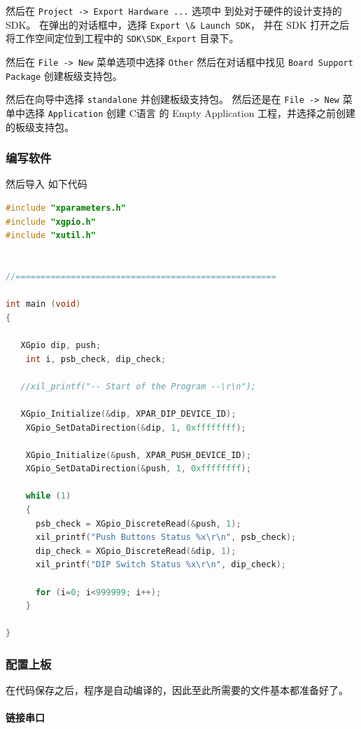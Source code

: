 \documentclass{ctexart}
\begin{document}
        然后在 \verb|Project -> Export Hardware ...| 选项中
        到处对于硬件的设计支持的 SDK。
        在弹出的对话框中，选择 \verb|Export \& Launch SDK|，
        并在 SDK 打开之后将工作空间定位到工程中的
        \verb|SDK\SDK_Export| 目录下。
        
        然后在 \verb|File -> New| 菜单选项中选择 \verb|Other|
        然后在对话框中找见 \verb|Board Support Package|
        创建板级支持包。

        然后在向导中选择 \verb|standalone| 并创建板级支持包。
        然后还是在 \verb|File -> New| 菜单中选择 \verb|Application|
        创建 C语言 的 Empty Application 工程，并选择之前创建的板级支持包。

        \subsubsection{编写软件}

        然后导入 如下代码
\begin{lstlisting}[language=C]
#include "xparameters.h"
#include "xgpio.h"
#include "xutil.h"
  

//====================================================

int main (void) 
{

   XGpio dip, push;
	int i, psb_check, dip_check;
	
   //xil_printf("-- Start of the Program --\r\n");
 
   XGpio_Initialize(&dip, XPAR_DIP_DEVICE_ID);
	XGpio_SetDataDirection(&dip, 1, 0xffffffff);
	
	XGpio_Initialize(&push, XPAR_PUSH_DEVICE_ID);
	XGpio_SetDataDirection(&push, 1, 0xffffffff);
	
	while (1)
	{
	  psb_check = XGpio_DiscreteRead(&push, 1);
	  xil_printf("Push Buttons Status %x\r\n", psb_check);
	  dip_check = XGpio_DiscreteRead(&dip, 1);
	  xil_printf("DIP Switch Status %x\r\n", dip_check);
	  
	  for (i=0; i<999999; i++); 
	}
 
}
\end{lstlisting}
        
        \subsubsection{配置上板}
        
        在代码保存之后，程序是自动编译的，因此至此所需要的文件基本都准备好了。
        
        \paragraph{链接串口}
        
\end{document}

